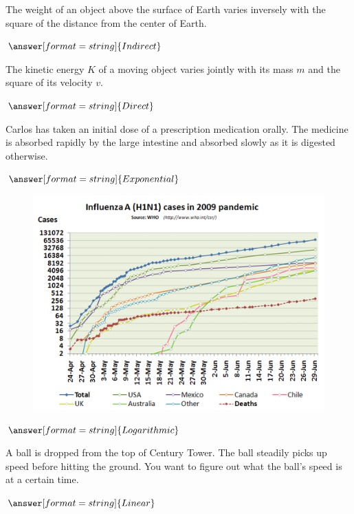 \documentclass{ximera}
\begin{document}
\begin{question}
The weight of an object above the surface of Earth varies inversely with the square of the distance from the center of Earth. 

$\answer[format=string]{Indirect}$

\end{question}

\begin{question}
The kinetic energy $K$ of a moving object varies jointly with its mass $m$ and the square of its velocity $v$.

$\answer[format=string]{Direct}$

\end{question}

\begin{question}
Carlos has taken an initial dose of a prescription medication orally. The medicine is absorbed rapidly by the large intestine and absorbed slowly as it is digested otherwise. 

$\answer[format=string]{Exponential}$

\end{question}

\begin{question}
\begin{figure}
	\includegraphics[scale=0.75]{Influenza-2009.png}
\end{figure}

$\answer[format=string]{Logarithmic}$

\end{question}

\begin{question}
A ball is dropped from the top of Century Tower. The ball steadily picks up speed before hitting the ground. You want to figure out what the ball's speed is at a certain time.

$\answer[format=string]{Linear}$
\end{question}
\end{document}
